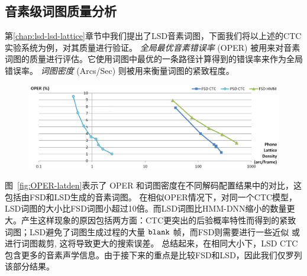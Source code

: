 \subsection{音素级词图质量分析}
\label{sec:exp-lsd-lat-quality}

第\ref{chap:lsd-lsd-lattice}章节中我们提出了LSD音素词图，下面我们将以上述的CTC实验系统为例，对其质量进行验证。
%
{\em 全局最优音素错误率} (OPER) 被用来对音素词图的质量进行评估。它使用词图中最优的一条路径计算得到的错误率来作为全局错误率\cite{hoffmeister2006frame}。 {\em 词图密度} (Arcs/Sec) 则被用来衡量词图的紧致程度\cite{woodland1994large}。


\begin{figure}[!htp]
  \centering
    \captionstyle{\centering}
    \includegraphics[width=\textwidth]{figure/OPER-latden.png}
\end{figure}


图~\ref{fig:OPER-latden}表示了 OPER 和词图密度在不同解码配置结果中的对比，这包括由FSD和LSD生成的音素词图。
在相似OPER情况下，对同一个CTC模型，LSD词图的大小比FSD词图小超过10倍。而LSD词图比HMM-DNN缩小的数量更大。产生这样现象的原因包括两方面：CTC更突出的后验概率特性而得到的紧致词图；LSD避免了词图生成过程的大量 $\tt blank$ 帧，而FSD则需要进行一些近似 \cite{ljolje1999efficient} 或进行词图裁剪\cite{povey2012generating}, 这将导致更大的搜索误差。
总结起来，在相同大小下，LSD CTC包含更多的音素声学信息。由于接下来的重点是比较FSD和LSD，因此我们仅罗列该部分结果。



